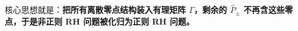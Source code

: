 \documentclass[
    lang=cn,
    scheme=chinese,
    mode=simple,
    device=normal,
    color=blue,
    math=cm,
    thmcnt=section,
    12pt
]{elegantbook}
\begin{document}
核心思想就是：\textbf{把所有离散零点结构装入有理矩阵 $\Gamma$，剩余的 $\widehat P_\pm$ 不再含这些零点，于是非正则 RH 问题被化归为正则 RH 问题。}








\end{document}
